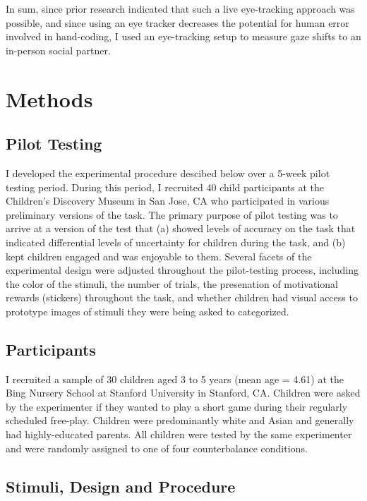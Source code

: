 \documentclass[floatsintext,man]{apa6}
\theoremstyle{definition}
\theoremstyle{definition}
\theoremstyle{definition}
\theoremstyle{remark}
\begin{document}
In sum, since prior research indicated that such a live eye-tracking
approach was possible, and since using an eye tracker decreases the
potential for human error involved in hand-coding, I used an
eye-tracking setup to measure gaze shifts to an in-person social
partner.

\section{Methods}\label{methods}

\subsection{Pilot Testing}\label{pilot-testing}

I developed the experimental procedure descibed below over a 5-week
pilot testing period. During this period, I recruited 40 child
participants at the Children's Discovery Museum in San Jose, CA who
participated in various preliminary versions of the task. The primary
purpose of pilot testing was to arrive at a version of the test that (a)
showed levels of accuracy on the task that indicated differential levels
of uncertainty for children during the task, and (b) kept children
engaged and was enjoyable to them. Several facets of the experimental
design were adjusted throughout the pilot-testing process, including the
color of the stimuli, the number of trials, the presenation of
motivational rewards (stickers) throughout the task, and whether
children had visual access to prototype images of stimuli they were
being asked to categorized.

\subsection{Participants}\label{participants}

I recruited a sample of 30 children aged 3 to 5 years (mean age = 4.61)
at the Bing Nursery School at Stanford University in Stanford, CA.
Children were asked by the experimenter if they wanted to play a short
game during their regularly scheduled free-play. Children were
predominantly white and Asian and generally had highly-educated parents.
All children were tested by the same experimenter and were randomly
assigned to one of four counterbalance conditions.

\subsection{Stimuli, Design and
Procedure}\label{stimuli-design-and-procedure}
\end{document}
